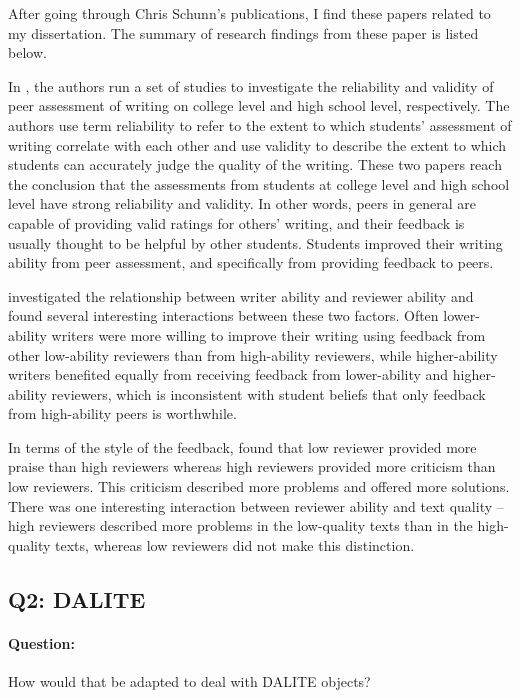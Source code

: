 \documentclass{article}
\begin{document}
After going through Chris Schunn's publications, I find these papers
\cite{patchan2016understanding,patchan2015understanding,
schunn2016reliability, cho2006validity}
related to my dissertation. The summary of research findings from
these paper is listed below.

In \cite{cho2006validity, schunn2016reliability}, the authors run a
set of studies to investigate the reliability and validity of peer
assessment of writing on college level and high school level,
respectively. The authors use term reliability to refer to the extent
to which students' assessment of writing correlate with each other and
use validity to describe the extent to which students can accurately
judge the quality of the writing. These two papers reach the
conclusion that the assessments from students at college level and
high school level have strong reliability and validity. In other
words, peers in general are capable of providing valid ratings for
others' writing, and their feedback is usually thought to be helpful
by other students. Students improved their writing ability from peer
assessment, and specifically from providing feedback to peers.

\cite{patchan2016understanding} investigated the relationship between
writer ability and reviewer ability and found several interesting interactions
between these two factors. Often lower-ability writers were more
willing to improve their writing using feedback from other low-ability
reviewers than from high-ability reviewers, while higher-ability
writers benefited equally from receiving feedback from lower-ability
and higher-ability reviewers, which is inconsistent with student
beliefs that only feedback from high-ability peers is worthwhile.

In terms of the style of the feedback, \cite{patchan2015understanding} found that low reviewer provided more praise than high reviewers
whereas high reviewers provided more criticism than low
reviewers. This criticism described more problems and offered more
solutions. There was one interesting interaction between reviewer
ability and text quality -- high reviewers described more problems in
the low-quality texts than in the high-quality texts, whereas low
reviewers did not make this distinction.

\subsection{Q2: DALITE}
\paragraph{Question:} How would that be adapted to deal with DALITE
objects? \\ [0.1 in]
\end{document}
